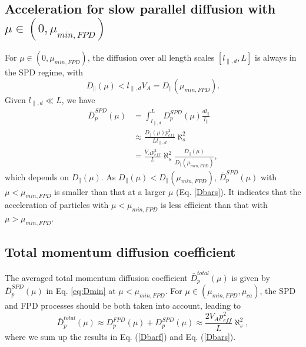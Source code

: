 \documentclass[preprint2,twocolumn,times,tighten]{aastex63}
\begin{document}
{\subsection{Acceleration for slow parallel diffusion with $\mu \in (0, \mu_{min,FPD})$}

For  $\mu \in (0, \mu_{min,FPD})$, the diffusion over all length scales $[l_{\|, d}, L]$ is always in the SPD regime, with 
\begin{equation}
  D_\| (\mu) < l_{\|,d} V_A=D_\|(\mu_{min,FPD}) .
  \label{eq:mumumin}
\end{equation}
{Given $l_{\|,d} \ll L$,} we have 
\begin{equation}
\begin{aligned}
    \bar{D}_p^{SPD} (\mu) &= \int_{l_{\|, d}}^{L} D_p^{SPD} (\mu) \frac{dl_\|}{l_{\|}}\\
    &\approx \frac{D_\| (\mu) p_{eff}^2}{L l_{\|,d}} \aleph_s^2\\
    &= \frac{V_A p_{eff}^2}{L} \aleph_s^2 \frac{D_\| (\mu)}{D_\| (\mu_{min,FPD})},
    \label{eq:Dmin}
\end{aligned}
\end{equation}
{which depends on $D_{\|}(\mu)$.}
As $D_\| (\mu) < D_\| (\mu_{min,FPD})$,
{$\bar{D}_p^{SPD}(\mu)$ with $\mu<\mu_{min,FPD}$ is smaller than that at a larger $\mu$ (Eq. \eqref{Dbars}).}
It indicates that 
the acceleration of particles with $\mu<\mu_{min,FPD}$ is less efficient than that with $\mu>\mu_{min,FPD}$. 





\subsection{Total momentum diffusion coefficient}


{The averaged total momentum diffusion coefficient $\bar{D}_p^{total}(\mu)$ is given by 
$\bar{D}_p^{SPD}(\mu)$ in Eq. \eqref{eq:Dmin} at $\mu< \mu_{min,FPD}$.}
For $\mu \in (\mu_{min,FPD}, \mu_{ca})$, 
the SPD and FPD processes should be both taken into account, leading to 
\begin{equation}\label{eq:totpu}
    \bar{D}_p^{total} (\mu)\approx D_p^{FPD} (\mu) + D_p^{SPD} (\mu)\approx \frac{2V_A p_{eff}^2}{ L} \aleph_s^2,
\end{equation}
where we sum up the results in Eq. (\ref{Dbarf}) and Eq. (\ref{Dbars}).

}
\end{document}

